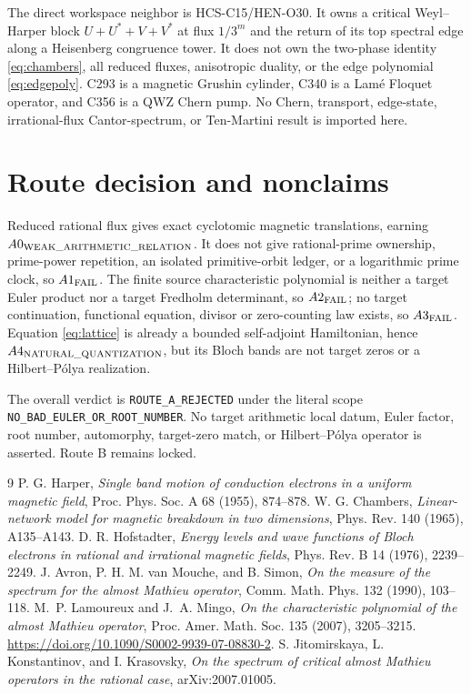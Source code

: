 \documentclass[10pt]{article}
\newcommand{\Scope}{\texttt{NO\_BAD\_EULER\_OR\_ROOT\_NUMBER}}
\begin{document}
The direct workspace neighbor is HCS-C15/HEN-O30.  It owns a critical
Weyl--Harper block $U+U^*+V+V^*$ at flux $1/3^m$ and the return of its top
spectral edge along a Heisenberg congruence tower.  It does not own the
two-phase identity \eqref{eq:chambers}, all reduced fluxes, anisotropic
duality, or the edge polynomial \eqref{eq:edgepoly}.  C293 is a magnetic
Grushin cylinder, C340 is a Lam\'e Floquet operator, and C356 is a QWZ Chern
pump.  No Chern, transport, edge-state, irrational-flux Cantor-spectrum, or
Ten-Martini result is imported here.

\section{Route decision and nonclaims}
Reduced rational flux gives exact cyclotomic magnetic translations, earning
$A0_{\rm WEAK\_ARITHMETIC\_RELATION}$.  It does not give rational-prime
ownership, prime-power repetition, an isolated primitive-orbit ledger, or
a logarithmic prime clock, so $A1_{\rm FAIL}$.  The finite source
characteristic polynomial is neither a target Euler product nor a target
Fredholm determinant, so $A2_{\rm FAIL}$; no target continuation,
functional equation, divisor or zero-counting law exists, so
$A3_{\rm FAIL}$.  Equation \eqref{eq:lattice} is already a bounded
self-adjoint Hamiltonian, hence $A4_{\rm NATURAL\_QUANTIZATION}$, but its
Bloch bands are not target zeros or a Hilbert--P\'olya realization.

The overall verdict is \texttt{ROUTE\_A\_REJECTED} under the literal scope
\Scope.  No target arithmetic local datum, Euler factor, root number,
automorphy, target-zero match, or Hilbert--P\'olya operator is asserted.
Route B remains locked.
\fi

\begin{thebibliography}{9}\small
{} P. G. Harper,
\emph{Single band motion of conduction electrons in a uniform magnetic
field}, Proc. Phys. Soc. A 68 (1955), 874--878.
 W. G. Chambers,
\emph{Linear-network model for magnetic breakdown in two dimensions},
Phys. Rev. 140 (1965), A135--A143.
 D. R. Hofstadter,
\emph{Energy levels and wave functions of Bloch electrons in rational and
irrational magnetic fields}, Phys. Rev. B 14 (1976), 2239--2249.
 J. Avron, P. H. M. van Mouche, and B. Simon,
\emph{On the measure of the spectrum for the almost Mathieu operator},
Comm. Math. Phys. 132 (1990), 103--118.
 M.~P. Lamoureux and J.~A. Mingo,
\emph{On the characteristic polynomial of the almost Mathieu operator},
Proc. Amer. Math. Soc. 135 (2007), 3205--3215.
\url{https://doi.org/10.1090/S0002-9939-07-08830-2}.
 S. Jitomirskaya, L. Konstantinov, and I. Krasovsky,
\emph{On the spectrum of critical almost Mathieu operators in the rational
case}, arXiv:2007.01005.
\end{thebibliography}
\end{document}
